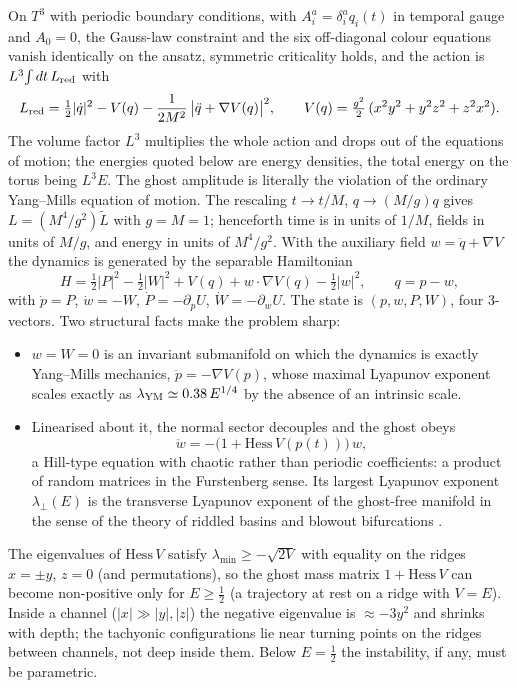\documentclass[11pt,a4paper]{article}
\newcommand{\Hess}{\mathrm{Hess}\,}
\newcommand{\YM}{{\rm YM}}
\begin{document}
On $T^3$ with periodic boundary conditions, with $A^a_i=\delta^a_i q_i(t)$ in temporal gauge and
$A_0=0$, the Gauss-law constraint and the six off-diagonal colour equations vanish identically on
the ansatz, symmetric criticality holds, and the action is $L^3\!\int dt\,L_{\rm red}$ with
\cite{note:derive}
\begin{equation}
L_{\rm red}=\tfrac12|\dot q|^2-V(q)-\frac1{2M^2}\,\big|\ddot q+\nabla V(q)\big|^2,\qquad
V(q)=\tfrac{g^2}2\,(x^2y^2+y^2z^2+z^2x^2).
\label{eq:Lred}
\end{equation}
The volume factor $L^3$ multiplies the whole action and drops out of the equations of motion; the
energies quoted below are energy densities, the total energy on the torus being $L^3E$. The ghost
amplitude is literally the violation of the ordinary Yang--Mills equation of motion.
The rescaling $t\to t/M$, $q\to(M/g)q$ gives $L=(M^4/g^2)\tilde L$ with $g=M=1$; henceforth time
is in units of $1/M$, fields in units of $M/g$, and energy in units of $M^4/g^2$. With the
auxiliary field $w=\ddot q+\nabla V$ the dynamics is generated by the separable Hamiltonian
\begin{equation}
H=\tfrac12|P|^2-\tfrac12|W|^2+V(q)+w\cdot\nabla V(q)-\tfrac12|w|^2,\qquad q=p-w,
\label{eq:H}
\end{equation}
with $\dot p=P$, $\dot w=-W$, $\dot P=-\partial_pU$, $\dot W=-\partial_wU$. The state is
$(p,w,P,W)$, four 3-vectors. Two structural facts make the problem sharp:
\begin{itemize}
\item $w=W=0$ is an invariant submanifold on which the dynamics is exactly Yang--Mills mechanics,
$\ddot p=-\nabla V(p)$, whose maximal Lyapunov exponent scales exactly as
$\lambda_\YM\simeq0.38\,E^{1/4}$ by the absence of an intrinsic scale.
\item Linearised about it, the normal sector decouples and the ghost obeys
\begin{equation}
\ddot w=-\big(1+\Hess V(p(t))\big)\,w ,
\label{eq:hill}
\end{equation}
a Hill-type equation with chaotic rather than periodic coefficients: a product of random
matrices in the Furstenberg sense. Its largest Lyapunov exponent $\lambda_\perp(E)$ is the
transverse Lyapunov exponent of the ghost-free manifold in the sense of the theory of riddled
basins and blowout bifurcations \cite{OttSommerer,ABS96}.
\end{itemize}
The eigenvalues of $\Hess V$ satisfy $\lambda_{\min}\ge-\sqrt{2V}$ with equality on the ridges
$x=\pm y$, $z=0$ (and permutations), so the ghost mass matrix $1+\Hess V$ can become non-positive
only for $E\ge\tfrac12$ (a trajectory at rest on a ridge with $V=E$). Inside a channel
($|x|\gg|y|,|z|$) the negative eigenvalue is $\approx-3y^2$ and shrinks with depth; the
tachyonic configurations lie near turning points on the ridges between channels, not deep inside
them. Below $E=\tfrac12$ the instability, if any, must be parametric.
\end{document}
